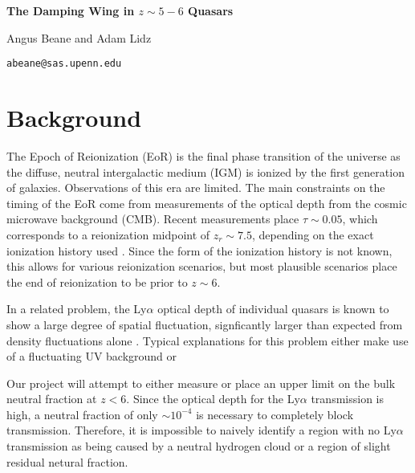 \documentclass[11pt,letterpaper]{article}
\begin{document}
\thispagestyle{firstpage}%
\ifdefined\dark
    \pagecolor{bggrey}
    \color{white}
\fi

\def\parskipdefault{\parskip}
\setlength{\parskip}{1.2ex}

\def\parindentdefault{\parindent}
\setlength{\parindent}{0pt}

\textbf{The Damping Wing in $z\sim5-6$ Quasars}

Angus Beane and Adam Lidz

\texttt{abeane@sas.upenn.edu}

\deemph{\today}

\section{Background}
The Epoch of Reionization (EoR) is the final phase transition of the universe
as the diffuse, neutral intergalactic medium (IGM) is ionized by the first
generation of galaxies. Observations of this era are limited. The main
constraints on the timing of the EoR come from measurements of the optical
depth from the cosmic microwave background (CMB). Recent measurements place
$\tau \sim 0.05$, which corresponds to a reionization midpoint of $z_r \sim
7.5$, depending on the exact ionization history used
\citep{2018arXiv180706209P}. Since the form of the ionization history is not
known, this allows for various reionization scenarios, but most plausible
scenarios place the end of reionization to be prior to $z\sim6$.

In a related problem, the Ly$\alpha$ optical depth of individual quasars is
known to show a large degree of spatial fluctuation, signficantly larger than
expected from density fluctuations alone \citep[e.g.][]{2015PASA...32...45B}.
Typical explanations for this problem either make use of a fluctuating UV
background \citep{2017MNRAS.465.3429C} or

Our project will attempt to either measure or place an upper limit on the bulk
neutral fraction at $z<6$. Since the optical depth for the Ly$\alpha$
transmission is high, a neutral fraction of only $\sim10^{-4}$ is necessary to
completely block transmission. Therefore, it is impossible to naively identify
a region with no Ly$\alpha$ transmission as being caused by a neutral hydrogen
cloud or a region of slight residual netural fraction.
\end{document}
